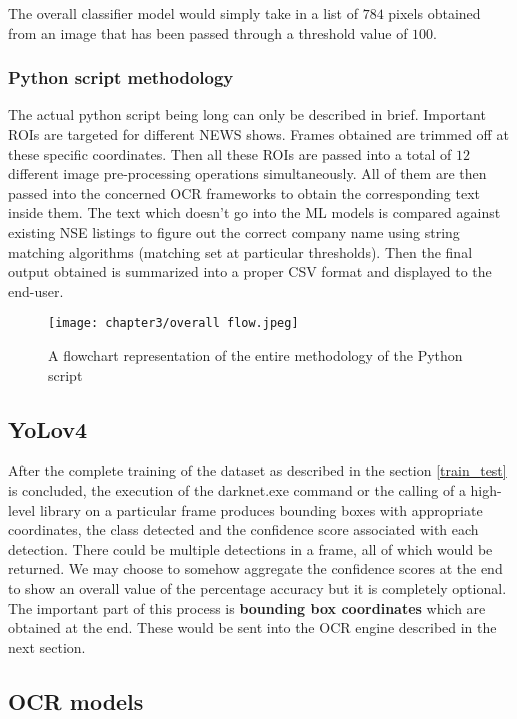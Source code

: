 The overall classifier model would simply take in a list of $784$ pixels obtained from an image that has been passed through a threshold value of $100$.

\subsubsection{Python script methodology}
The actual python script being long can only be described in brief. Important ROIs are targeted for different NEWS shows. Frames obtained are trimmed off at these specific coordinates. Then all these ROIs are passed into a total of $12$ different image pre-processing operations simultaneously. All of them are then passed into the concerned OCR frameworks to obtain the corresponding text inside them. The text which doesn’t go into the ML models is compared against existing NSE listings to figure out the correct company name using string matching algorithms (matching set at particular thresholds). Then the final output obtained is summarized into a proper CSV format and displayed to the end-user.

\begin{figure}[h]
  \centering
  \texttt{[image: chapter3/overall flow.jpeg]}
  \caption{A flowchart representation of the entire methodology of the Python script}
  \label{fig:process_flow_python}
\end{figure}

\subsection{YoLov4} \label{yv4}

After the complete training of the dataset as described in the section \ref{train_test} is concluded, the execution of the {\selectfont darknet.exe} command or the calling of a high-level library on a particular frame produces bounding boxes with appropriate coordinates, the class detected and the confidence score associated with each detection. There could be multiple detections in a frame, all of which would be returned. We may choose to somehow aggregate the confidence scores at the end to show an overall value of the percentage accuracy but it is completely optional. The important part of this process is \textbf{bounding box coordinates} which are obtained at the end. These would be sent into the OCR engine described in the next section.

\subsection{OCR models}


